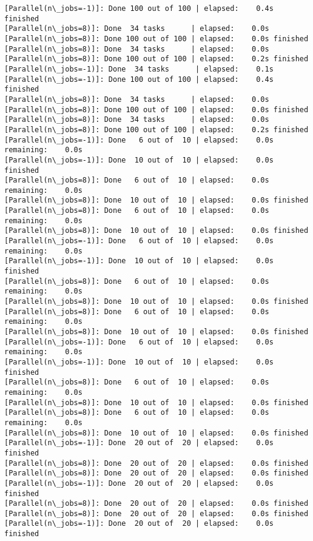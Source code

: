 \documentclass[11pt]{article}
\begin{document}
\begin{Verbatim}[commandchars=\\\{\}]
[Parallel(n\_jobs=-1)]: Done 100 out of 100 | elapsed:    0.4s finished
[Parallel(n\_jobs=8)]: Done  34 tasks      | elapsed:    0.0s
[Parallel(n\_jobs=8)]: Done 100 out of 100 | elapsed:    0.0s finished
[Parallel(n\_jobs=8)]: Done  34 tasks      | elapsed:    0.0s
[Parallel(n\_jobs=8)]: Done 100 out of 100 | elapsed:    0.2s finished
[Parallel(n\_jobs=-1)]: Done  34 tasks      | elapsed:    0.1s
[Parallel(n\_jobs=-1)]: Done 100 out of 100 | elapsed:    0.4s finished
[Parallel(n\_jobs=8)]: Done  34 tasks      | elapsed:    0.0s
[Parallel(n\_jobs=8)]: Done 100 out of 100 | elapsed:    0.0s finished
[Parallel(n\_jobs=8)]: Done  34 tasks      | elapsed:    0.0s
[Parallel(n\_jobs=8)]: Done 100 out of 100 | elapsed:    0.2s finished
[Parallel(n\_jobs=-1)]: Done   6 out of  10 | elapsed:    0.0s remaining:    0.0s
[Parallel(n\_jobs=-1)]: Done  10 out of  10 | elapsed:    0.0s finished
[Parallel(n\_jobs=8)]: Done   6 out of  10 | elapsed:    0.0s remaining:    0.0s
[Parallel(n\_jobs=8)]: Done  10 out of  10 | elapsed:    0.0s finished
[Parallel(n\_jobs=8)]: Done   6 out of  10 | elapsed:    0.0s remaining:    0.0s
[Parallel(n\_jobs=8)]: Done  10 out of  10 | elapsed:    0.0s finished
[Parallel(n\_jobs=-1)]: Done   6 out of  10 | elapsed:    0.0s remaining:    0.0s
[Parallel(n\_jobs=-1)]: Done  10 out of  10 | elapsed:    0.0s finished
[Parallel(n\_jobs=8)]: Done   6 out of  10 | elapsed:    0.0s remaining:    0.0s
[Parallel(n\_jobs=8)]: Done  10 out of  10 | elapsed:    0.0s finished
[Parallel(n\_jobs=8)]: Done   6 out of  10 | elapsed:    0.0s remaining:    0.0s
[Parallel(n\_jobs=8)]: Done  10 out of  10 | elapsed:    0.0s finished
[Parallel(n\_jobs=-1)]: Done   6 out of  10 | elapsed:    0.0s remaining:    0.0s
[Parallel(n\_jobs=-1)]: Done  10 out of  10 | elapsed:    0.0s finished
[Parallel(n\_jobs=8)]: Done   6 out of  10 | elapsed:    0.0s remaining:    0.0s
[Parallel(n\_jobs=8)]: Done  10 out of  10 | elapsed:    0.0s finished
[Parallel(n\_jobs=8)]: Done   6 out of  10 | elapsed:    0.0s remaining:    0.0s
[Parallel(n\_jobs=8)]: Done  10 out of  10 | elapsed:    0.0s finished
[Parallel(n\_jobs=-1)]: Done  20 out of  20 | elapsed:    0.0s finished
[Parallel(n\_jobs=8)]: Done  20 out of  20 | elapsed:    0.0s finished
[Parallel(n\_jobs=8)]: Done  20 out of  20 | elapsed:    0.0s finished
[Parallel(n\_jobs=-1)]: Done  20 out of  20 | elapsed:    0.0s finished
[Parallel(n\_jobs=8)]: Done  20 out of  20 | elapsed:    0.0s finished
[Parallel(n\_jobs=8)]: Done  20 out of  20 | elapsed:    0.0s finished
[Parallel(n\_jobs=-1)]: Done  20 out of  20 | elapsed:    0.0s finished

\end{Verbatim}
\end{document}

